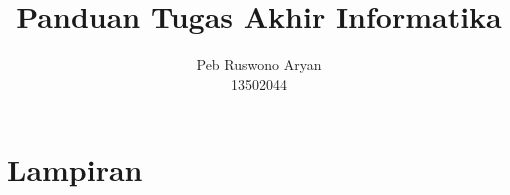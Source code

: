 \documentclass[12pt, a4paper, onecolumn, oneside, final]{report}
\begin{document}
\title{Panduan Tugas Akhir Informatika}
\date{}
\author{Peb Ruswono Aryan\\
13502044}

\setcounter{page}{0}



\pagestyle{plain}





\tableofcontents
\listoffigures
\listoftables

\setcounter{page}{0}











\printbibliography

\appendix
{}
\part*{Lampiran}



\end{document}
